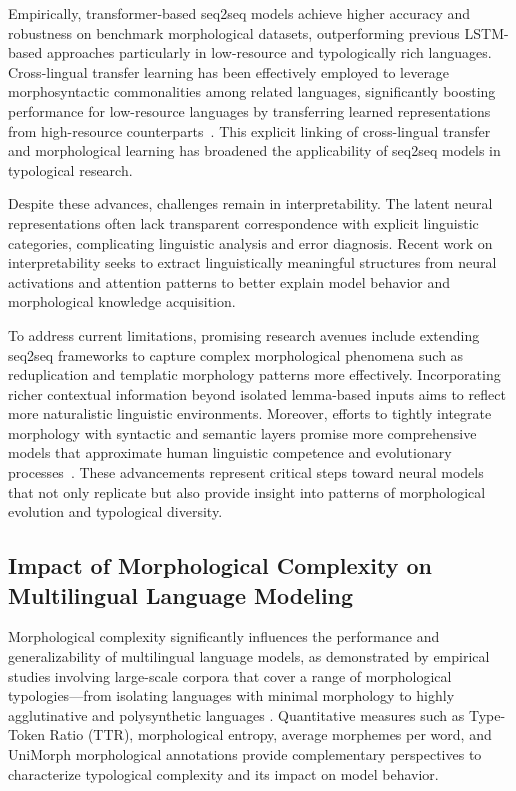 \documentclass[sigconf]{acmart}
\begin{document}
Empirically, transformer-based seq2seq models achieve higher accuracy and robustness on benchmark morphological datasets, outperforming previous LSTM-based approaches particularly in low-resource and typologically rich languages. Cross-lingual transfer learning has been effectively employed to leverage morphosyntactic commonalities among related languages, significantly boosting performance for low-resource languages by transferring learned representations from high-resource counterparts~\cite{ref42}. This explicit linking of cross-lingual transfer and morphological learning has broadened the applicability of seq2seq models in typological research.

Despite these advances, challenges remain in interpretability. The latent neural representations often lack transparent correspondence with explicit linguistic categories, complicating linguistic analysis and error diagnosis. Recent work on interpretability seeks to extract linguistically meaningful structures from neural activations and attention patterns to better explain model behavior and morphological knowledge acquisition.

To address current limitations, promising research avenues include extending seq2seq frameworks to capture complex morphological phenomena such as reduplication and templatic morphology patterns more effectively. Incorporating richer contextual information beyond isolated lemma-based inputs aims to reflect more naturalistic linguistic environments. Moreover, efforts to tightly integrate morphology with syntactic and semantic layers promise more comprehensive models that approximate human linguistic competence and evolutionary processes~\cite{ref42}. These advancements represent critical steps toward neural models that not only replicate but also provide insight into patterns of morphological evolution and typological diversity.

\subsection{Impact of Morphological Complexity on Multilingual Language Modeling}

Morphological complexity significantly influences the performance and generalizability of multilingual language models, as demonstrated by empirical studies involving large-scale corpora that cover a range of morphological typologies—from isolating languages with minimal morphology to highly agglutinative and polysynthetic languages \cite{ref34}. Quantitative measures such as Type-Token Ratio (TTR), morphological entropy, average morphemes per word, and UniMorph morphological annotations provide complementary perspectives to characterize typological complexity and its impact on model behavior.
\end{document}
